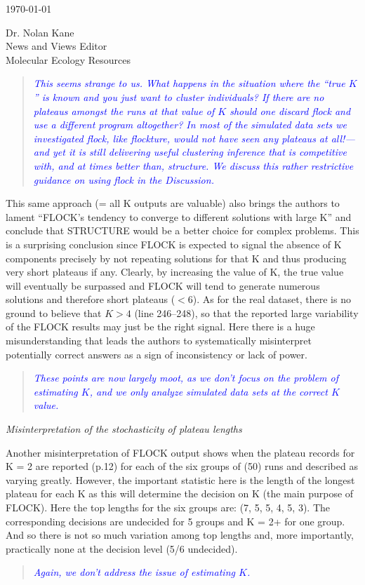 \documentclass[11pt]{letter}
\newcommand{\reply}[1]{\begin{quotation}\small\sl\textcolor{blue}{#1}\end{quotation}}
\begin{document}
\begin{letter}{ \today 

Dr. Nolan Kane\\
News and Views Editor\\
Molecular Ecology Resources \\
}
\reply{This seems strange to us.  What happens in the situation where the
``true $K$'' is known and you just want to cluster individuals? If there are no plateaus
amongst the runs at that value of $K$ should one discard {\sc flock} and use
a different program altogether? In most of the simulated data sets we investigated {\sc flock},
like {\sc flockture},
would not have seen any plateaus at all!---and yet it is still delivering useful clustering
inference that is competitive with, and at times better than, {\sc structure}.  We discuss
this rather restrictive guidance on using {\sc flock} in the Discussion.  }

This same approach (= all K outputs are valuable) also brings the authors to lament ``FLOCK's tendency to converge to different solutions with large K'' and conclude that STRUCTURE would be a better choice for complex problems. This is a surprising conclusion since FLOCK is expected to signal the absence of K components precisely by not repeating solutions for that K and thus producing very short plateaus if any. Clearly, by increasing the value of K, the true value will eventually be surpassed and FLOCK will tend to generate numerous solutions and therefore short plateaus ($< 6$). As for the real dataset, there is no ground to believe that $K > 4$ (line 246--248), so that the reported large variability of the FLOCK results may just be the right signal. Here there is a huge misunderstanding that leads the authors to systematically misinterpret potentially correct answers as a sign of inconsistency or lack of power.

\reply{These points are now largely moot, as we don't focus on the problem of estimating $K$, and we
only analyze simulated data sets at the correct $K$ value.}

{\em Misinterpretation of the stochasticity of plateau lengths}

Another misinterpretation of FLOCK output shows when the plateau records for K = 2 are reported (p.12) for each of the six groups of (50) runs and described as varying greatly. However, the important statistic here is the length of the longest plateau for each K as this will determine the decision on K (the main purpose of FLOCK). Here the top lengths for the six groups are: (7, 5, 5, 4, 5, 3). The corresponding decisions are undecided for 5 groups and K = 2+ for one group. And so there is not so much variation among top lengths and, more importantly, practically none at the decision level (5/6 undecided).

\reply{Again, we don't address the issue of estimating $K$. }



\end{letter}
\end{document}

